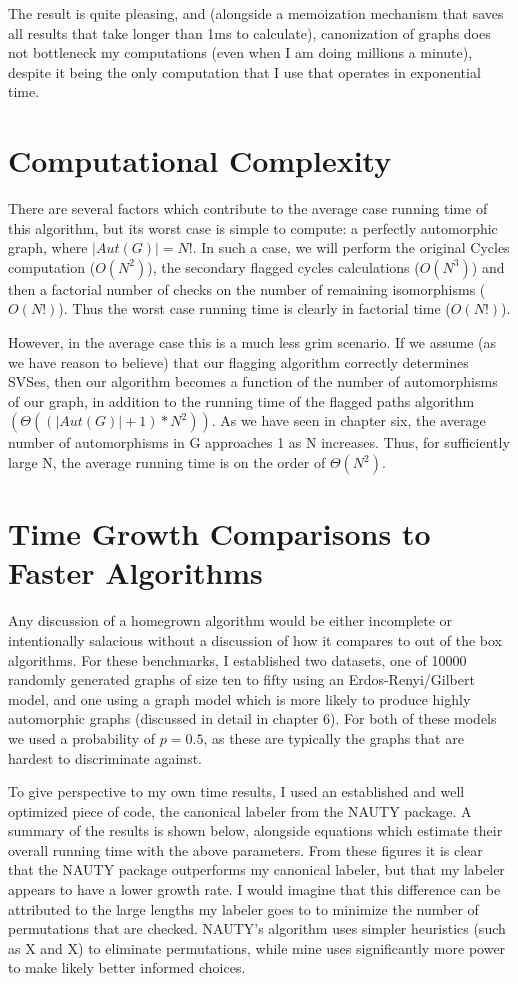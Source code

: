 The result is quite pleasing, and (alongside a memoization mechanism that saves all results that take longer than 1ms to calculate), canonization of graphs does not bottleneck my computations (even when I am doing millions a minute), despite it being the only computation that I use that operates in exponential time.

\section{Computational Complexity}

There are several factors which contribute to the average case running time of this algorithm, but its worst case is simple to compute: a perfectly automorphic graph, where $|Aut(G)| = N!$.
In such a case, we will perform the original Cycles computation ($O(N^2)$), the secondary flagged cycles calculations ($O(N^3)$) and then a factorial number of checks on the number of remaining isomorphisms ($O(N!)$).
Thus the worst case running time is clearly in factorial time ($O(N!)$).

However, in the average case this is a much less grim scenario.
If we assume (as we have reason to believe) that our flagging algorithm correctly determines SVSes, then our algorithm becomes a function of the number of automorphisms of our graph, in addition to the running time of the flagged paths algorithm $(\Theta((|Aut(G)| +1) * N^2))$.
As we have seen in chapter six, the average number of automorphisms in G approaches 1 as N increases. Thus, for sufficiently large N, the average running time is on the order of $\Theta(N^2)$.

\section{Time Growth Comparisons to Faster Algorithms}
Any discussion of a homegrown algorithm would be either incomplete or intentionally salacious without a discussion of how it compares to out of the box algorithms.
For these benchmarks, I established two datasets, one of 10000 randomly generated graphs of size ten to fifty using an Erdos-Renyi/Gilbert model, and one using a graph model which is more likely to produce highly automorphic graphs (discussed in detail in chapter 6).
For both of these models we used a probability of $p=0.5$, as these are typically the graphs that are hardest to discriminate against.

To give perspective to my own time results, I used an established and well optimized piece of code, the canonical labeler from the NAUTY package.
A summary of the results is shown below, alongside equations which estimate their overall running time with the above parameters.
From these figures it is clear that the NAUTY package outperforms my canonical labeler, but that my labeler appears to have a lower growth rate.
I would imagine that this difference can be attributed to the large lengths my labeler goes to to minimize the number of permutations that are checked.
NAUTY's algorithm uses simpler heuristics (such as X and X) to eliminate permutations, while mine uses significantly more power to make likely better informed choices.
